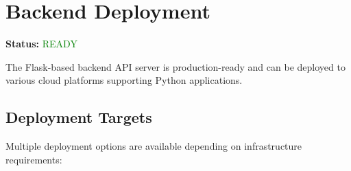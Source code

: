 


\section{Backend Deployment}

\textbf{Status:} \textcolor{green}{READY}

The Flask-based backend API server is production-ready and can be deployed to various cloud platforms supporting Python applications.

\subsection{Deployment Targets}

Multiple deployment options are available depending on infrastructure requirements:

